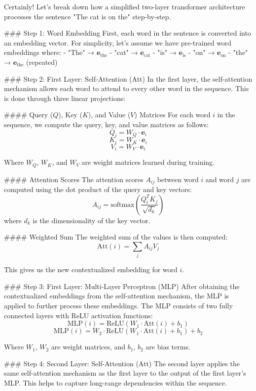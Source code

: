 Certainly! Let's break down how a simplified two-layer transformer architecture processes the sentence "The cat is on the" step-by-step.

### Step 1: Word Embedding
First, each word in the sentence is converted into an embedding vector. For simplicity, let's assume we have pre-trained word embeddings where:
- "The" → \( \mathbf{e}_{\text{the}} \)
- "cat" → \( \mathbf{e}_{\text{cat}} \)
- "is" → \( \mathbf{e}_{\text{is}} \)
- "on" → \( \mathbf{e}_{\text{on}} \)
- "the" → \( \mathbf{e}_{\text{the}} \) (repeated)

### Step 2: First Layer: Self-Attention (Att)
In the first layer, the self-attention mechanism allows each word to attend to every other word in the sequence. This is done through three linear projections:

#### Query (\(Q\)), Key (\(K\)), and Value (\(V\)) Matrices
For each word \(i\) in the sequence, we compute the query, key, and value matrices as follows:
\[ Q_i = W_Q \cdot \mathbf{e}_i \]
\[ K_i = W_K \cdot \mathbf{e}_i \]
\[ V_i = W_V \cdot \mathbf{e}_i \]

Where \(W_Q\), \(W_K\), and \(W_V\) are weight matrices learned during training.

#### Attention Scores
The attention scores \(A_{ij}\) between word \(i\) and word \(j\) are computed using the dot product of the query and key vectors:
\[ A_{ij} = \text{softmax}\left(\frac{Q_i^T K_j}{\sqrt{d_k}}\right) \]
where \(d_k\) is the dimensionality of the key vector.

#### Weighted Sum
The weighted sum of the values is then computed:
\[ \text{Att}(i) = \sum_j A_{ij} V_j \]

This gives us the new contextualized embedding for word \(i\).

### Step 3: First Layer: Multi-Layer Perceptron (MLP)
After obtaining the contextualized embeddings from the self-attention mechanism, the MLP is applied to further process these embeddings. The MLP consists of two fully connected layers with ReLU activation functions:
\[ \text{MLP}(i) = \text{ReLU}(W_1 \cdot \text{Att}(i) + b_1) \]
\[ \text{MLP}(i) = W_2 \cdot \text{ReLU}(W_1 \cdot \text{Att}(i) + b_1) + b_2 \]

Where \(W_1\), \(W_2\) are weight matrices, and \(b_1\), \(b_2\) are bias terms.

### Step 4: Second Layer: Self-Attention (Att)
The second layer applies the same self-attention mechanism as the first layer to the output of the first layer's MLP. This helps to capture long-range dependencies within the sequence.

